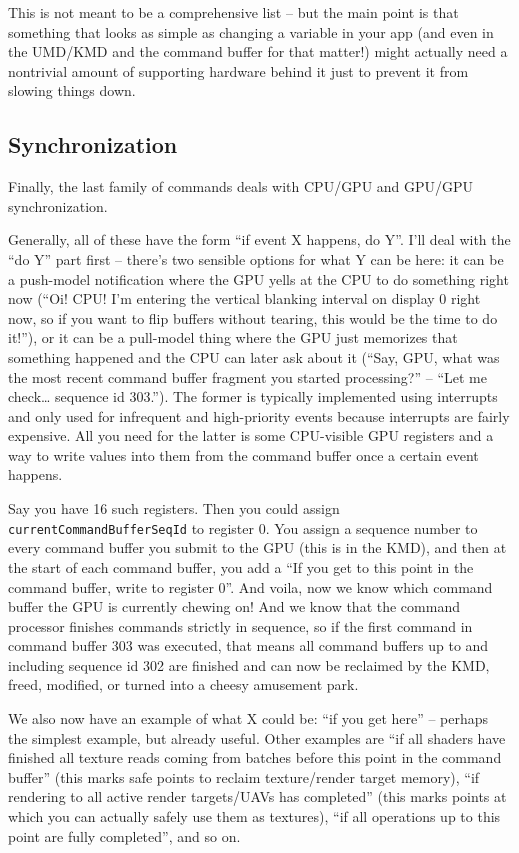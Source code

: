 \documentclass[12pt]{article}
\begin{document}
\begin{itemize}
This is not meant to be a comprehensive list – but the main point is that something that looks as simple as changing a variable in your app (and even in the UMD/KMD and the command buffer for that matter!) might actually need a nontrivial amount of supporting hardware behind it just to prevent it from slowing things down.
\end{itemize}

\subsection{Synchronization}
\label{sec:org7748aa2}

Finally, the last family of commands deals with CPU/GPU and GPU/GPU synchronization.

Generally, all of these have the form “if event X happens, do Y”. I’ll deal with the “do Y” part first – there’s two sensible options for what Y can be here: it can be a push-model notification where the GPU yells at the CPU to do something right now (“Oi! CPU! I’m entering the vertical blanking interval on display 0 right now, so if you want to flip buffers without tearing, this would be the time to do it!”), or it can be a pull-model thing where the GPU just memorizes that something happened and the CPU can later ask about it (“Say, GPU, what was the most recent command buffer fragment you started processing?” – “Let me check… sequence id 303.”). The former is typically implemented using interrupts and only used for infrequent and high-priority events because interrupts are fairly expensive. All you need for the latter is some CPU-visible GPU registers and a way to write values into them from the command buffer once a certain event happens.

Say you have 16 such registers. Then you could assign \texttt{currentCommandBufferSeqId} to register 0. You assign a sequence number to every command buffer you submit to the GPU (this is in the KMD), and then at the start of each command buffer, you add a “If you get to this point in the command buffer, write to register 0”. And voila, now we know which command buffer the GPU is currently chewing on! And we know that the command processor finishes commands strictly in sequence, so if the first command in command buffer 303 was executed, that means all command buffers up to and including sequence id 302 are finished and can now be reclaimed by the KMD, freed, modified, or turned into a cheesy amusement park.

We also now have an example of what X could be: “if you get here” – perhaps the simplest example, but already useful. Other examples are “if all shaders have finished all texture reads coming from batches before this point in the command buffer” (this marks safe points to reclaim texture/render target memory), “if rendering to all active render targets/UAVs has completed” (this marks points at which you can actually safely use them as textures), “if all operations up to this point are fully completed”, and so on.
\end{document}
